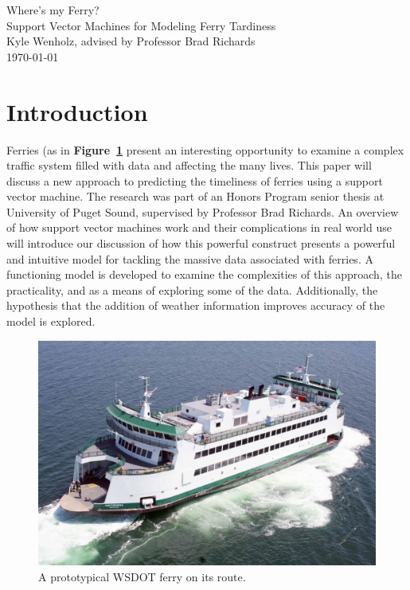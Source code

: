 \documentclass[11pt]{article} %
\begin{document}
\begin{titlepage}
    \vspace*{\fill}
    \begin{center}
      \Huge{Where's my Ferry?}\\[0.5cm]
      \Large{Support Vector Machines for Modeling Ferry Tardiness}\\[0.4cm]
      Kyle Wenholz, advised by Professor Brad Richards\\
      \today
    \end{center}
    \vspace*{\fill}
  \end{titlepage}
\newpage
\vspace*{\fill}
\tableofcontents
\vspace*{\fill}
\newpage

\section{Introduction}
\label{sec:intro}
Ferries (as in \textbf{Figure~\ref{fig:basicferry}} present an interesting 
opportunity to examine a complex traffic system filled with data and affecting 
the many lives. This paper will discuss a new approach to predicting 
the timeliness of ferries using a support vector machine. The research was part
of an Honors Program senior thesis at University of Puget Sound, supervised by 
Professor Brad Richards. An overview of how 
support vector machines work and their complications in real world use will 
introduce our discussion of how this powerful construct presents a powerful and 
intuitive model for tackling the massive data associated with ferries.  A 
functioning model is developed to examine the complexities of this
approach, the practicality, and as a means of exploring some of the data. 
Additionally, the hypothesis that the addition of weather information improves 
accuracy of the model is explored.

\begin{figure}[h]
  \centering
  \includegraphics[scale=.15]{images/ferry.jpg}
  \caption{A prototypical WSDOT ferry on its route.}
  \label{fig:basicferry}
\end{figure}
\end{document}
